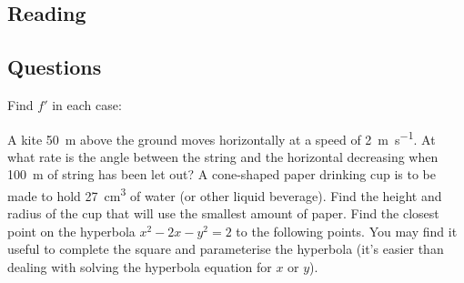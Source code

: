 


\subsection*{Reading}

\subsection*{Questions}
\begin{questions}
  \question Find $ f' $ in each case:
  \question A kite \SI{50}{\metre} above the ground moves horizontally at a speed of \SI{2}{\metre\per\second}. At
            what rate is the angle between the string and the horizontal decreasing when \SI{100}{\metre} of string
            has been let out?
  \question A cone-shaped paper drinking cup is to be made to hold \SI{27}{\centi\metre\cubed} of water (or other liquid
            beverage). Find the height and radius of the cup that will use the smallest amount of paper.
  \question Find the closest point on the hyperbola $ x^2 - 2x - y^2 = 2 $ to the following points.
            You may find it useful to complete the square and parameterise the hyperbola (it's easier than dealing with
            solving the hyperbola equation for $ x $ or $ y $).
\end{questions}


